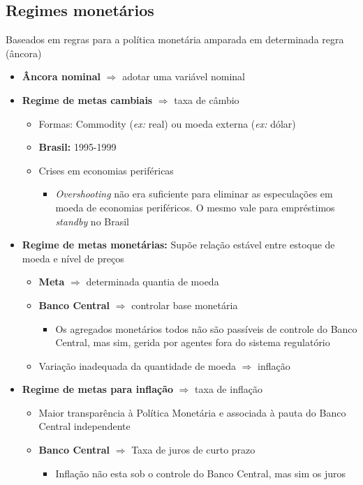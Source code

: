 \documentclass[11pt]{article}
\begin{document}
\subsection*{Regimes monetários}
\label{sec:org27e9307}

Baseados em regras para a política monetária amparada em determinada regra (âncora)

\begin{itemize}
\item \textbf{Âncora nominal} \(\Rightarrow\) adotar uma variável nominal
\item \textbf{Regime de metas cambiais} \(\Rightarrow\) taxa de câmbio
\begin{itemize}
\item Formas: Commodity (\emph{ex:} real) ou moeda externa (\emph{ex:} dólar)
\item \textbf{Brasil:} 1995-1999
\item Crises em economias periféricas
\begin{itemize}
\item \emph{Overshooting} não era suficiente para eliminar as especulações em moeda de economias periféricos. O mesmo vale para empréstimos \emph{standby} no Brasil
\end{itemize}
\end{itemize}
\item \textbf{Regime de metas monetárias:} Supõe relação estável entre estoque de moeda e nível de preços
\begin{itemize}
\item \textbf{Meta} \(\Rightarrow\) determinada quantia de moeda
\item \textbf{Banco Central} \(\Rightarrow\) controlar base monetária
\begin{itemize}
\item Os agregados monetários todos não são passíveis de controle do Banco Central, mas sim, gerida por agentes fora do sistema regulatório
\end{itemize}
\item Variação inadequada da quantidade de moeda \(\Rightarrow\) inflação
\end{itemize}
\item \textbf{Regime de metas para inflação} \(\Rightarrow\) taxa de inflação
\begin{itemize}
\item Maior transparência à Política Monetária e associada à pauta do Banco Central independente
\item \textbf{Banco Central} \(\Rightarrow\) Taxa de juros de curto prazo
\begin{itemize}
\item Inflação não esta sob o controle do Banco Central, mas sim os juros
\end{itemize}
\end{itemize}
\end{itemize}
\end{document}
